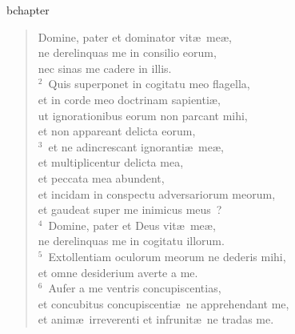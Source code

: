 bchapter\begin{verse}\vspace{-19pt}Domine, pater et dominator vit\ae\ me\ae ,\\ ne derelinquas me in consilio eorum,\\ nec sinas me cadere in illis.\\
${}^{2}$~Quis superponet in cogitatu meo flagella,\\ et in corde meo doctrinam sapienti\ae ,\\ ut ignorationibus eorum non parcant mihi,\\ et non appareant delicta eorum,\\
${}^{3}$~et ne adincrescant ignoranti\ae\ me\ae ,\\ et multiplicentur delicta mea,\\ et peccata mea abundent,\\ et incidam in conspectu adversariorum meorum,\\ et gaudeat super me inimicus meus~?\\
${}^{4}$~Domine, pater et Deus vit\ae\ me\ae ,\\ ne derelinquas me in cogitatu illorum.\\
${}^{5}$~Extollentiam oculorum meorum ne dederis mihi,\\ et omne desiderium averte a me.\\
${}^{6}$~Aufer a me ventris concupiscentias,\\ et concubitus concupiscenti\ae\ ne apprehendant me,\\ et anim\ae\ irreverenti et infrunit\ae\ ne tradas me.\end{verse}


